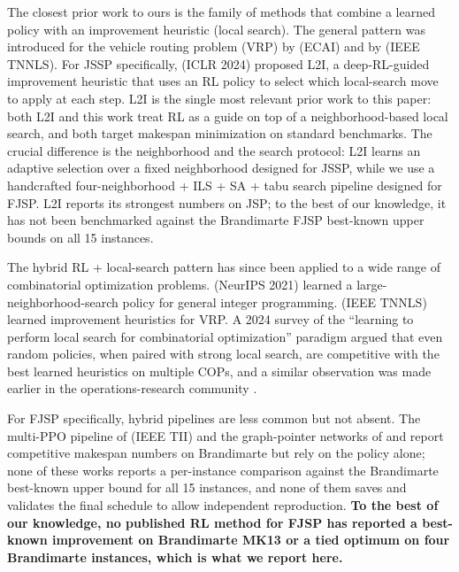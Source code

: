 \documentclass[10pt]{article}
\theoremstyle{definition}
\begin{document}
The closest prior work to ours is the family of methods that
combine a learned policy with an improvement heuristic (local
search). The general pattern was introduced for the vehicle
routing problem (VRP) by \citet{Hottung2022} (ECAI) and by
\citet{Wu2021TNNLS-VRP} (IEEE TNNLS). For JSSP specifically,
\citet{Zhang2024L2I} (ICLR 2024) proposed L2I, a deep-RL-guided
improvement heuristic that uses an RL policy to select which
local-search move to apply at each step. L2I is the single most
relevant prior work to this paper: both L2I and this work treat
RL as a guide on top of a neighborhood-based local search, and
both target makespan minimization on standard benchmarks. The
crucial difference is the neighborhood and the search protocol:
L2I learns an adaptive selection over a fixed neighborhood
designed for JSSP, while we use a handcrafted four-neighborhood +
ILS + SA + tabu search pipeline designed for FJSP. L2I reports
its strongest numbers on JSP; to the best of our knowledge, it
has not been benchmarked against the Brandimarte FJSP best-known
upper bounds on all 15 instances.

The hybrid RL + local-search pattern has since been applied to a
wide range of combinatorial optimization problems.
\citet{Wu2021NeurIPS-LNS} (NeurIPS 2021) learned a
large-neighborhood-search policy for general integer programming.
\citet{Wu2021TNNLS-VRP} (IEEE TNNLS) learned improvement
heuristics for VRP. A 2024 survey of the
``learning to perform local search for combinatorial
optimization'' paradigm
\citep{Bengio2021Survey, Mazyavkina2021RLCO} argued that
even random policies, when paired with strong local
search, are competitive with the best learned
heuristics on multiple COPs, and a similar observation
was made earlier in the operations-research community
\citep{Stutzle2006ILS}.

For FJSP specifically, hybrid pipelines are less common
but not absent. The multi-PPO pipeline of
\citet{Lei2022} (IEEE TII) and the graph-pointer
networks of \citet{Lei2022} and \citet{Song2022TII}
report competitive makespan numbers on Brandimarte but
rely on the policy alone; none of these works reports
a per-instance comparison against the Brandimarte
best-known upper bound for all 15 instances, and none
of them saves and validates the final schedule to
allow independent reproduction. \textbf{To the best
of our knowledge, no published RL method for FJSP has
reported a best-known improvement on Brandimarte MK13
or a tied optimum on four Brandimarte instances, which
is what we report here.}
\end{document}
